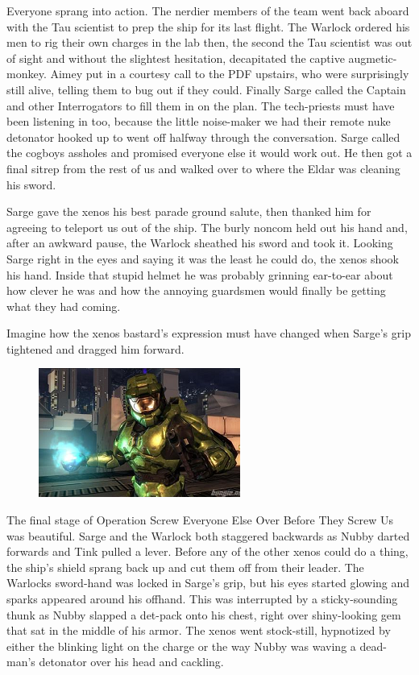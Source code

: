 Everyone sprang into action. 
The nerdier members of the team went back aboard with the Tau scientist to prep the ship for its last flight. 
The Warlock ordered his men to rig their own charges in the lab then, the second the Tau scientist was out of sight and without the slightest hesitation, decapitated the captive augmetic-monkey. 
Aimey put in a courtesy call to the PDF upstairs, who were surprisingly still alive, telling them to bug out if they could. 
Finally Sarge called the Captain and other Interrogators to fill them in on the plan. 
The tech-priests must have been listening in too, because the little noise-maker we had their remote nuke detonator hooked up to went off halfway through the conversation. 
Sarge called the cogboys assholes and promised everyone else it would work out. 
He then got a final sitrep from the rest of us and walked over to where the Eldar was cleaning his sword.

Sarge gave the xenos his best parade ground salute, then thanked him for agreeing to teleport us out of the ship. 
The burly noncom held out his hand and, after an awkward pause, the Warlock sheathed his sword and took it. 
Looking Sarge right in the eyes and saying it was the least he could do, the xenos shook his hand. 
Inside that stupid helmet he was probably grinning ear-to-ear about how clever he was and how the annoying guardsmen would finally be getting what they had coming. 


Imagine how the xenos bastard's expression must have changed when Sarge's grip tightened and dragged him forward.

\begin{figure}
	\begin{center}
		\includegraphics[width=\figwidth]{pics/11/86.png}
	\end{center}
\end{figure}
The final stage of Operation Screw Everyone Else Over Before They Screw Us was beautiful. 
Sarge and the Warlock both staggered backwards as Nubby darted forwards and Tink pulled a lever. 
Before any of the other xenos could do a thing, the ship's shield sprang back up and cut them off from their leader. 
The Warlocks sword-hand was locked in Sarge's grip, but his eyes started glowing and sparks appeared around his offhand. 
This was interrupted by a sticky-sounding thunk as Nubby slapped a det-pack onto his chest, right over shiny-looking gem that sat in the middle of his armor. 
The xenos went stock-still, hypnotized by either the blinking light on the charge or the way Nubby was waving a dead-man's detonator over his head and cackling.

